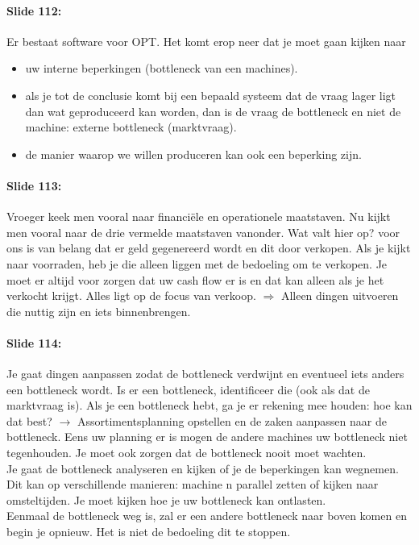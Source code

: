 \documentclass[10pt,a4paper]{report}
\begin{document}
\paragraph{Slide 112:} Er bestaat software voor OPT. Het komt erop neer dat je moet gaan kijken naar 
\begin{itemize}
\item uw interne beperkingen (bottleneck van een machines).
\item als je tot de conclusie komt bij een bepaald systeem dat de vraag lager ligt dan wat geproduceerd kan worden, dan is de vraag de bottleneck en niet de machine: externe bottleneck (marktvraag). 
\item de manier waarop we willen produceren kan ook een beperking zijn.
\end{itemize}

\paragraph{Slide 113:} Vroeger keek men vooral naar financi\"ele en operationele maatstaven. Nu kijkt men vooral naar de drie vermelde maatstaven vanonder. Wat valt hier op? voor ons is van belang dat er geld gegenereerd wordt en dit door verkopen. Als je kijkt naar voorraden, heb je die alleen liggen met de bedoeling om te verkopen. Je moet er altijd voor zorgen dat uw cash flow er is en dat kan alleen als je het verkocht krijgt. Alles ligt op de focus van verkoop. $\Rightarrow$ Alleen dingen uitvoeren die nuttig zijn en iets binnenbrengen.

\paragraph{Slide 114:} Je gaat dingen aanpassen zodat de bottleneck verdwijnt en eventueel iets anders een bottleneck wordt. Is er een bottleneck, identificeer die (ook als dat de marktvraag is). Als je een bottleneck hebt, ga je er rekening mee houden: hoe kan dat best? $\rightarrow$ Assortimentsplanning opstellen en de zaken aanpassen naar de bottleneck. Eens uw planning er is mogen de andere machines uw bottleneck niet tegenhouden. Je moet ook zorgen dat de bottleneck nooit moet wachten.\\
Je gaat de bottleneck analyseren en kijken of je de beperkingen kan wegnemen. Dit kan op verschillende manieren: machine n parallel zetten of kijken naar omsteltijden. Je moet kijken hoe je uw bottleneck kan ontlasten.\\
Eenmaal de bottleneck weg is, zal er een andere bottleneck naar boven komen en begin je opnieuw. Het is niet de bedoeling dit te stoppen.
\end{document}
